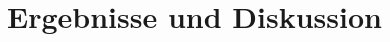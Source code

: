 \documentclass[10pt,twocolumn]{scrartcl}
\begin{document}
%
%
%
%
%
%

\section*{Ergebnisse und Diskussion}
\end{document}
